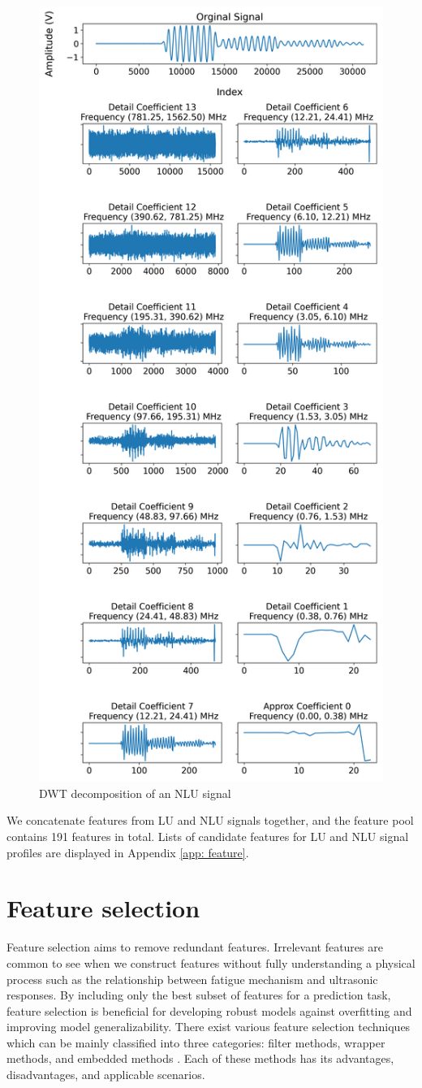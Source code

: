 \begin{figure}[tb]
    \centering
    \includegraphics[height=\linewidth]{fig/dwt_decomposition.png}
    \caption{DWT decomposition of an NLU signal}
    \label{fig: dwt decomposition}
\end{figure}

We concatenate features from LU and NLU signals together, and the feature pool contains 191 features in total. Lists of candidate features for LU and NLU signal profiles are displayed in Appendix \ref{app: feature}.

\section{Feature selection}
Feature selection aims to remove redundant features. Irrelevant features are common to see when we construct features without fully understanding a physical process such as the relationship between fatigue mechanism and ultrasonic responses. By including only the best subset of features for a prediction task, feature selection is beneficial for developing robust models against overfitting and improving model generalizability. There exist various feature selection techniques which can be mainly classified into three categories: filter methods, wrapper methods, and embedded methods \cite{Guyon2002}. Each of these methods has its advantages, disadvantages, and applicable scenarios.


